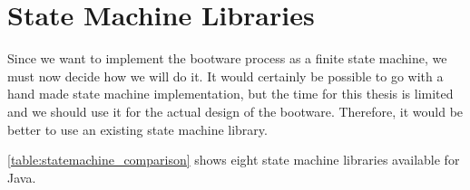 \section{State Machine Libraries}

Since we want to implement the bootware process as a finite state machine, we must now decide how we will do it.
It would certainly be possible to go with a hand made state machine implementation, but the time for this thesis is limited and we should use it for the actual design of the bootware.
Therefore, it would be better to use an existing state machine library.

\autoref{table:statemachine_comparison} shows eight state machine libraries available for Java.

\vspace*{\baselineskip}
\begingroup
	\centering
	\captionsetup{type=table}
